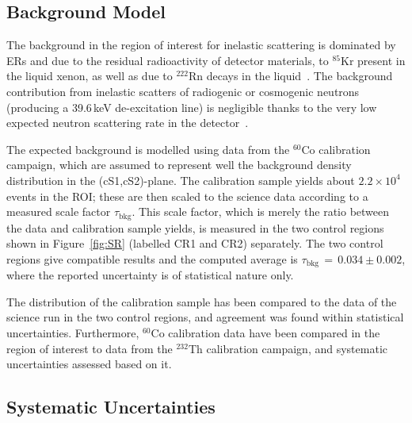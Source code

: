 \subsection {Background Model}

The background in the region of interest for inelastic scattering is dominated by ERs and due to the residual radioactivity of detector materials, to $^{85}$Kr present in the liquid xenon, as well as due to $^{222}$Rn decays in the liquid~\cite{Aprile:2011vb}. The background contribution from inelastic scatters of radiogenic or cosmogenic neutrons (producing a 39.6\,keV de-excitation line) is negligible thanks to the very low expected neutron scattering rate in the detector~\cite{Aprile:2013tov}.


The expected background is modelled using data from the $^{60}$Co calibration campaign, which are assumed to represent well the background density distribution 
in the (cS1,cS2)-plane. The calibration sample yields  about $2.2\times10^4$ events in the ROI; these are then scaled to the science data according to a measured scale 
factor $\tau_{\text{bkg}}$. This scale factor, which is merely the ratio between the data and calibration sample yields, is measured in the two control regions shown in Figure~\ref{fig:SR} (labelled CR1 and CR2) separately. The two control regions give compatible results and the computed average is $\tau_{\text{bkg}} \, =  \, 0.034 \pm 0.002 $, where the reported uncertainty 
is of statistical nature only.

The distribution of the calibration sample has been compared to the data of the science run in the two control regions,
and agreement was found within statistical uncertainties. Furthermore, $^{60}$Co calibration data have been compared in the region of interest to  
data from the $^{232}$Th calibration campaign, and systematic uncertainties assessed based on it.




\subsection{Systematic Uncertainties}

